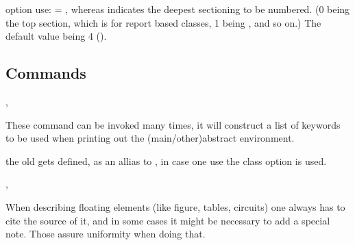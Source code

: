 \documentclass[article,nogeometry,english,tocdepth=3,secdepth=3]{ufrgscca} %
\begin{document}
\begin{describelist}{option}
	 { use:  = , whereas  indicates the deepest sectioning to be numbered. (0 being the top section, which is \tsmacro{\chapter}{} for report based classes, 1 being \tsmacro{\section}{}, and so on.) The default value being 4 (\tsmacro{\paragraph}{}).}

\end{describelist}


\subsection{Commands}

\begin{codedescribe}[code,new=2023/11/18]{\mainkeyword,\otherkeyword}
	\begin{codesyntax}%
	\end{codesyntax}
  These command can be invoked many times, it will construct a list of keywords  to be used when printing out the (main/other)abstract environment.
\end{codedescribe}
\begin{tsremark}
  the old  gets defined, as an allias to \tsobj{\mainkeyword}, in case one use the  class option is used.
\end{tsremark}

\begin{codedescribe}{\sourcecitation,\note}
	\begin{codesyntax}
		\tsmacro{\sourcecitation}{source}
		\tsmacro{\note}{text}
	\end{codesyntax}
When describing floating elements (like figure, tables, circuits) one always has to cite the source of it, and in some cases it might be necessary to add a special note. Those assure uniformity when doing that.
\end{codedescribe}
\end{document}
